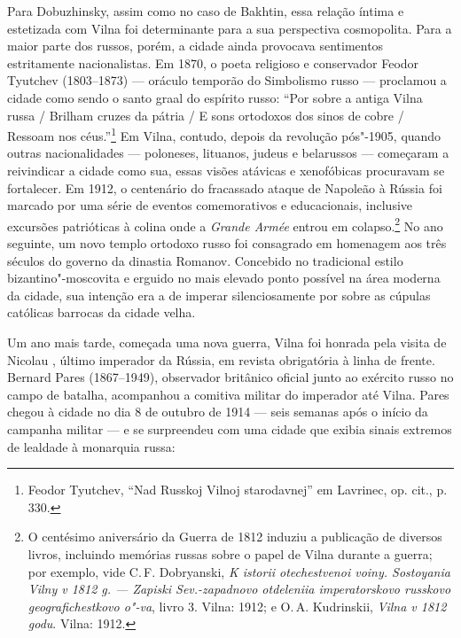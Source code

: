 Para Dobuzhinsky, assim como no caso de Bakhtin, essa relação íntima e
estetizada com Vilna foi determinante para a sua perspectiva
cosmopolita. Para a maior parte dos russos, porém, a cidade ainda
provocava sentimentos estritamente nacionalistas. Em 1870, o poeta
religioso e conservador Feodor Tyutchev (1803--1873) --- oráculo temporão
do Simbolismo russo --- proclamou a cidade como sendo o santo graal do
espírito russo: ``Por sobre a antiga Vilna russa / Brilham cruzes da
pátria / E sons ortodoxos dos sinos de cobre / Ressoam nos
céus.''\footnote{Feodor Tyutchev, ``Nad Russkoj Vilnoj starodavnej'' em
  Lavrinec, op. cit., p. 330.} Em Vilna, contudo, depois da revolução
pós"-1905, quando outras nacionalidades --- poloneses, lituanos, judeus e
belarussos --- começaram a reivindicar a cidade como sua, essas visões
atávicas e xenofóbicas procuravam se fortalecer. Em 1912, o centenário
do fracassado ataque de Napoleão à Rússia foi marcado por uma série de
eventos comemorativos e educacionais, inclusive excursões patrióticas à
colina onde a \emph{Grande Armée} entrou em colapso.\footnote{O
  centésimo aniversário da Guerra de 1812 induziu a publicação de
  diversos livros, incluindo memórias russas sobre o papel de Vilna
  durante a guerra; por exemplo, vide C.\,F. Dobryanski, \emph{K istorii
  otechestvenoi voiny. Sostoyania Vilny v 1812 g. --- Zapiski
  Sev.-zapadnovo otdeleniia imperatorskovo russkovo geografichestkovo
  o"-va}, livro 3. Vilna: 1912; e O.\,A. Kudrinskii, \emph{Vilna v 1812
  godu}. Vilna: 1912.} No ano seguinte, um novo templo ortodoxo russo
foi consagrado em homenagem aos três séculos do governo da dinastia
Romanov. Concebido no tradicional estilo bizantino"-moscovita e erguido
no mais elevado ponto possível na área moderna da cidade, sua intenção
era a de imperar silenciosamente por sobre as cúpulas católicas barrocas
da cidade velha.

Um ano mais tarde, começada uma nova guerra, Vilna foi honrada pela
visita de Nicolau , último imperador da Rússia, em revista obrigatória
à linha de frente. Bernard Pares (1867--1949), observador britânico
oficial junto ao exército russo no campo de batalha, acompanhou a
comitiva militar do imperador até Vilna. Pares chegou à cidade no dia 8
de outubro de 1914 --- seis semanas após o início da campanha militar --- e
se surpreendeu com uma cidade que exibia sinais extremos de lealdade à
monarquia russa:

